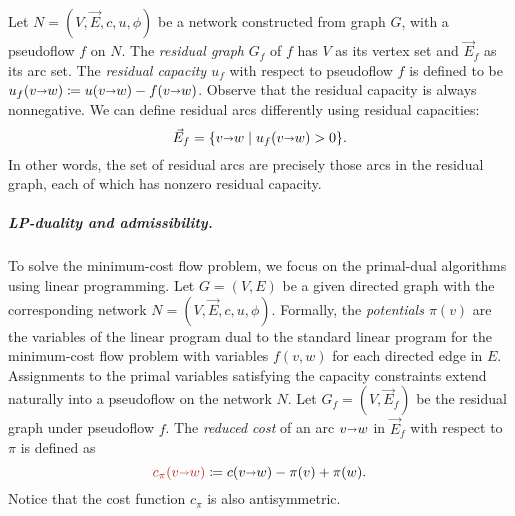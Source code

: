 \documentclass[a4paper,UKenglish]{socg-lipics-v2018}
\makeatletter
\def\note#1{\textcolor{red}{{#1}}}
\def\fsupply{\phi}
\def\arcto{\mathord\shortrightarrow}
\def\arc#1#2{#1\arcto#2}
\theoremstyle{plain}
\numberwithin{figure}{section}
\renewcommand{\paragraph}{\subparagraph}
\def\EMPH#1{\textcolor{BrickRed}{{\emph{#1}}}}
\def\n@te#1{\textsf{\boldmath \textbf{$\langle\!\langle$#1$\rangle\!\rangle$}}\leavevmode}
\def\note#1{\textcolor{red}{\n@te{#1}}}
\makeatother
\begin{document}
\begin{toappendix}
Let $N = (V,\vec{E},c,u,\fsupply)$ be a network constructed from graph $G$, with a pseudoflow $f$ on $N$.
The \EMPH{residual graph} $G_f$ of $f$ has $V$ as its vertex set and $\vec{E}_f$ as its arc set.
%
The \EMPH{residual capacity $u_f$} with respect to
pseudoflow $f$ is defined to be $u_f(\arc vw) \coloneqq u(\arc vw) - f(\arc vw)$.
Observe that the residual capacity is always nonnegative.
We can define residual arcs differently using residual capacities:
\[
\vec{E}_f = \{\arc vw \mid u_f(\arc vw) > 0\}.
\]
In other words, the set of residual arcs are precisely those arcs in the residual graph, each of which has nonzero residual capacity.
%
%
%

\end{toappendix}

\paragraph{LP-duality and admissibility.}
To solve the minimum-cost flow problem, we focus on the primal-dual algorithms using linear programming.
Let $G = (V,E)$ be a given directed graph with the corresponding network $N = (V,\vec{E},c,u,\fsupply)$.
Formally, the
\EMPH{potentials $\pi(v)$} are the variables of the linear program dual to the standard linear program for the minimum-cost flow problem with variables $f(v,w)$ for each directed edge in $E$.
Assignments to the primal variables satisfying the capacity constraints extend naturally into a pseudoflow on the network $N$.
Let $G_f = (V,\vec{E}_f)$ be the residual graph under pseudoflow $f$.
The \EMPH{reduced cost} of an arc $\arc vw$ in $\vec{E}_f$ with respect to $\pi$ is defined as
\[
\EMPH{$c_\pi(\arc vw)$} \coloneqq c(\arc vw) - \pi(v) + \pi(w).
\]
Notice that the cost function $c_\pi$ is also antisymmetric.
\end{document}
